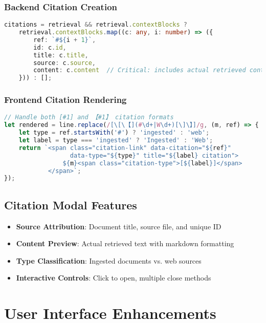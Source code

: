 \documentclass[12pt,a4paper]{article}
\begin{document}
\subsubsection{Backend Citation Creation}
\begin{lstlisting}[language=typescript, caption=Citation Object Creation in Orchestrator]
citations = retrieval && retrieval.contextBlocks ? 
    retrieval.contextBlocks.map((c: any, i: number) => ({ 
        ref: `#${i + 1}`, 
        id: c.id, 
        title: c.title, 
        source: c.source,
        content: c.content  // Critical: includes actual retrieved content
    })) : [];
\end{lstlisting}

\subsubsection{Frontend Citation Rendering}
\begin{lstlisting}[language=javascript, caption=Citation Link Creation with Dual Format Support]
// Handle both [#1] and 【#1】 citation formats
let rendered = line.replace(/[\[\【](#\d+|W\d+)[\]\】]/g, (m, ref) => {
    let type = ref.startsWith('#') ? 'ingested' : 'web';
    let label = type === 'ingested' ? 'Ingested' : 'Web';
    return `<span class="citation-link" data-citation="${ref}" 
                  data-type="${type}" title="${label} citation">
                ${m}<span class="citation-type">[${label}]</span>
            </span>`;
});
\end{lstlisting}

\subsection{Citation Modal Features}
\begin{itemize}
    \item \textbf{Source Attribution}: Document title, source file, and unique ID
    \item \textbf{Content Preview}: Actual retrieved text with markdown formatting
    \item \textbf{Type Classification}: Ingested documents vs. web sources
    \item \textbf{Interactive Controls}: Click to open, multiple close methods
\end{itemize}

\section{User Interface Enhancements}
\end{document}

